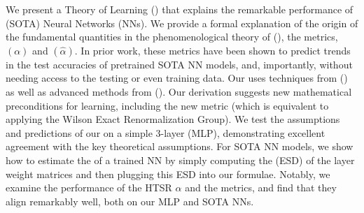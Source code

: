 We present a \SemiEmpirical Theory of Learning (\SETOL)
that explains the remarkable performance of \StateOfTheArt (SOTA) Neural Networks (NNs).
We provide a formal explanation of the origin of the
fundamental quantities in the phenomenological theory of  \HeavyTailedSelfRegularization (\HTSR), the 
\HeavyTailed \PowerLaw \LayerQuality metrics,
\ALPHAHAT $(\alpha)$ and \ALPHAHAT $(\hat{\alpha})$.
In prior work, these metrics have been shown to predict trends in the test accuracies of pretrained SOTA NN models,
and, importantly,  without needing access to the testing or even training data.
Our \SETOL
uses techniques from \StatisticalMechanics (\STATMECH) as well as advanced methods from \RandomMatrixTheory (\RMT). Our derivation suggests new mathematical preconditions for \emph{\Ideal} learning, including the new \TRACELOG metric (which is equivalent to applying the Wilson Exact Renormalization Group).
We test the assumptions and predictions of our \SETOL on a simple 3-layer
\MultiLayer \Perceptron (MLP), demonstrating excellent agreement with the key theoretical assumptions. 
For SOTA NN models, we show how to estimate the \ModelQuality of a trained NN by simply computing the \EmpiricalSpectralDensity (ESD) of the layer weight matrices and
then plugging this ESD into our \SETOL formulae.
Notably, we examine the performance of the HTSR $\alpha$ and the \SETOL \TRACELOG \LayerQuality metrics, and find that they align
remarkably well, both on our MLP and SOTA NNs.


